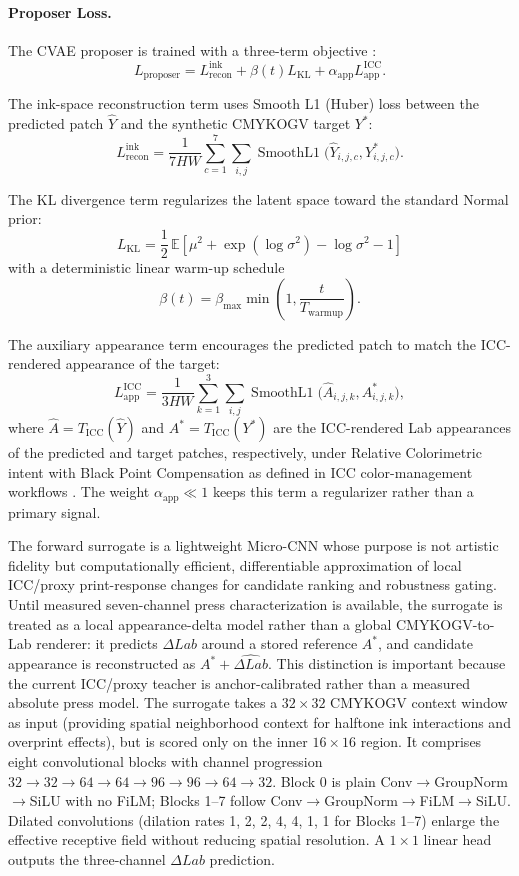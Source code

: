 \documentclass[11pt]{article}
\begin{document}
\paragraph{Proposer Loss.}

The CVAE proposer is trained with a three-term objective \cite{bo}:
\[
L_{\text{proposer}} = L^{\text{ink}}_{\text{recon}} + \beta(t) L_{\text{KL}} + \alpha_{\text{app}} L^{\text{ICC}}_{\text{app}}.
\]

The ink-space reconstruction term uses Smooth L1 (Huber) loss between the predicted patch $\hat{Y}$ and the synthetic CMYKOGV target $Y^*$:
\[
L^{\text{ink}}_{\text{recon}} =
\frac{1}{7HW}\sum_{c=1}^{7}\sum_{i,j}
\operatorname{SmoothL1}\!\bigl(\hat{Y}_{i,j,c}, Y^*_{i,j,c}\bigr).
\]

The KL divergence term regularizes the latent space toward the standard Normal prior:
\[
L_{\text{KL}} =
\frac{1}{2}\,\mathbb{E}\!\left[\mu^2 + \exp(\log \sigma^2) - \log \sigma^2 - 1\right]
\]
with a deterministic linear warm-up schedule
\[
\beta(t) = \beta_{\max}\min\!\left(1, \frac{t}{T_{\text{warmup}}}\right).
\]

The auxiliary appearance term encourages the predicted patch to match the ICC-rendered appearance of the target:
\[
L^{\text{ICC}}_{\text{app}} =
\frac{1}{3HW}\sum_{k=1}^{3}\sum_{i,j}
\operatorname{SmoothL1}\!\bigl(\hat{A}_{i,j,k}, A^*_{i,j,k}\bigr),
\]
where $\hat{A} = T_{\text{ICC}}(\hat{Y})$ and $A^* = T_{\text{ICC}}(Y^*)$ are the ICC-rendered Lab appearances of the predicted and target patches, respectively, under Relative Colorimetric intent with Black Point Compensation as defined in ICC color-management workflows \cite{icc}. The weight $\alpha_{\text{app}} \ll 1$ keeps this term a regularizer rather than a primary signal.

The forward surrogate is a lightweight Micro-CNN whose purpose is not artistic fidelity but computationally efficient, differentiable approximation of local ICC/proxy print-response changes for candidate ranking and robustness gating. Until measured seven-channel press characterization is available, the surrogate is treated as a local appearance-delta model rather than a global CMYKOGV-to-Lab renderer: it predicts $\Delta Lab$ around a stored reference $A^*$, and candidate appearance is reconstructed as $A^*+\widehat{\Delta Lab}$. This distinction is important because the current ICC/proxy teacher is anchor-calibrated rather than a measured absolute press model. The surrogate takes a $32\times 32$ CMYKOGV context window as input (providing spatial neighborhood context for halftone ink interactions and overprint effects), but is scored only on the inner $16\times 16$ region. It comprises eight convolutional blocks with channel progression $32 \rightarrow 32 \rightarrow 64 \rightarrow 64 \rightarrow 96 \rightarrow 96 \rightarrow 64 \rightarrow 32$. Block 0 is plain Conv$\rightarrow$GroupNorm$\rightarrow$SiLU with no FiLM; Blocks 1--7 follow Conv$\rightarrow$GroupNorm$\rightarrow$FiLM$\rightarrow$SiLU. Dilated convolutions (dilation rates 1, 2, 2, 4, 4, 1, 1 for Blocks 1--7) enlarge the effective receptive field without reducing spatial resolution. A $1\times 1$ linear head outputs the three-channel $\Delta Lab$ prediction.
\end{document}
